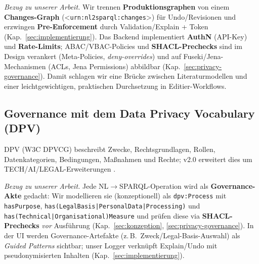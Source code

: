 \textit{Bezug zu unserer Arbeit.} Wir trennen \textbf{Produktionsgraphen} von einem \textbf{Changes-Graph} (<\texttt{urn:nl2sparql:changes}>) für Undo/Revisionen und erzwingen \textbf{Pre-Enforcement} durch Validation/Explain + Token (Kap.~\ref{sec:implementierung}). Das Backend implementiert \textbf{AuthN} (API-Key) und \textbf{Rate-Limits}; ABAC/VBAC-Policies und \textbf{SHACL-Prechecks} sind im Design verankert (Meta-Policies, \emph{deny-overrides}) und auf Fuseki/Jena-Mechanismen (ACLs, Jena Permissions) abbildbar (Kap.~\ref{sec:privacy-governance}). Damit schlagen wir eine Brücke zwischen Literaturmodellen und einer leichtgewichtigen, praktischen Durchsetzung in Editier-Workflows.

\subsection{Governance mit dem Data Privacy Vocabulary (DPV)}
DPV (W3C DPVCG) beschreibt Zwecke, Rechtsgrundlagen, Rollen, Datenkategorien, Bedingungen, Maßnahmen und Rechte; v2.0 erweitert dies um TECH/AI/LEGAL-Erweiterungen \cite{dpv2024w3c}.

\textit{Bezug zu unserer Arbeit.} Jede NL{\(\rightarrow\)}SPARQL-Operation wird als \textbf{Governance-Akte} gedacht: Wir modellieren sie (konzeptionell) als \texttt{dpv:Process} mit \texttt{hasPurpose}, \texttt{has(LegalBasis|PersonalData|Processing)} und \texttt{has(Technical|Organisational)Measure} und prüfen diese via \textbf{SHACL-Prechecks} \emph{vor} Ausführung (Kap.~\ref{sec:konzeption}, \ref{sec:privacy-governance}). In der UI werden Governance-Artefakte (z.\,B.\ Zweck/Legal-Basis-Auswahl) als \emph{Guided Patterns} sichtbar; unser Logger verknüpft Explain/Undo mit pseudonymisierten Inhalten (Kap.~\ref{sec:implementierung}).

